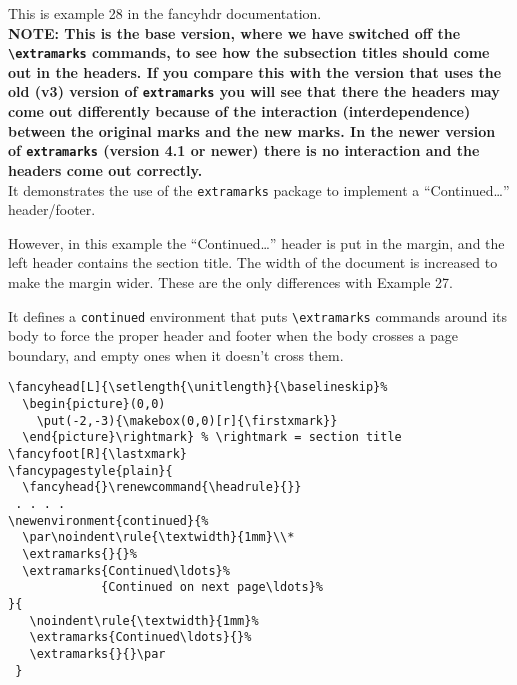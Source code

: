 \documentclass{report}
\begin{document}
\tableofcontents

\thispagestyle{plain}
\noindent
\begin{boxedminipage}{\textwidth}
This is example 28 in the fancyhdr documentation.
\\[1ex]
{\bfseries NOTE: This is the base version, where we have switched off the \verb|\extramarks| commands, to see how the subsection titles should come out in the headers. If you compare this with the version that uses the old (v3) version of \texttt{extramarks} you will see that there the headers may come out differently because of the interaction (interdependence) between the original marks and the new marks. In the newer version of \texttt{extramarks} (version 4.1 or newer) there is no interaction and the headers come out correctly.}
\\[1ex]
It demonstrates the use of the \texttt{extramarks} package to implement
a ``Continued\ldots'' header/footer.

However, in this example the ``Continued\ldots'' header is put in the margin, and the left header contains the section title. The width of the document is increased to make the margin wider. These are the only differences with Example 27.

It defines a \texttt{continued} environment that puts \verb|\extramarks| commands around its body to force the proper header and footer when the body crosses a page boundary, and empty ones when it doesn't cross them.

\begin{verbatim}
\fancyhead[L]{\setlength{\unitlength}{\baselineskip}%
  \begin{picture}(0,0)
    \put(-2,-3){\makebox(0,0)[r]{\firstxmark}}
  \end{picture}\rightmark} % \rightmark = section title
\fancyfoot[R]{\lastxmark}
\fancypagestyle{plain}{
  \fancyhead{}\renewcommand{\headrule}{}}
 . . . .
\newenvironment{continued}{%
  \par\noindent\rule{\textwidth}{1mm}\\*
  \extramarks{}{}%
  \extramarks{Continued\ldots}%
             {Continued on next page\ldots}%
}{
   \noindent\rule{\textwidth}{1mm}%
   \extramarks{Continued\ldots}{}%
   \extramarks{}{}\par
 }
\end{verbatim}

\end{boxedminipage}

\pagestyle{fancy}
\end{document}
